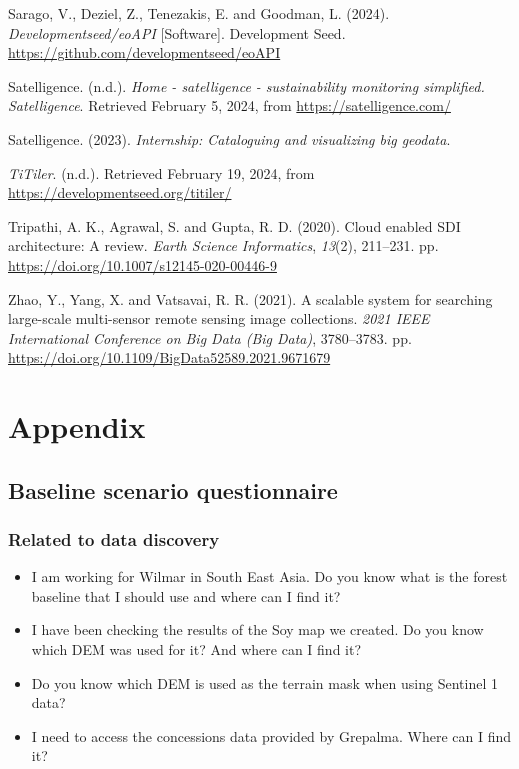 \documentclass[
  oneside,
  open=any]{scrbook}
\providecommand{\tightlist}{%
  \setlength{\itemsep}{0pt}\setlength{\parskip}{0pt}}\usepackage{longtable,booktabs,array}
\newlength{\cslhangindent}
\newenvironment{CSLReferences}[2] %
 {\begin{list}{}{%
  \setlength{\itemindent}{0pt}
  \setlength{\leftmargin}{0pt}
  \setlength{\parsep}{0pt}
  \ifodd #1
   \setlength{\leftmargin}{\cslhangindent}
   \setlength{\itemindent}{-1\cslhangindent}
  \fi
  \setlength{\itemsep}{#2\baselineskip}}}
 {\end{list}}
\begin{document}
\begin{CSLReferences}{1}{0}
Sarago, V., Deziel, Z., Tenezakis, E. and Goodman, L. (2024).
\emph{Developmentseed/{eoAPI}} {[}Software{]}. Development Seed.
\url{https://github.com/developmentseed/eoAPI}

Satelligence. (n.d.). \emph{Home - satelligence - sustainability
monitoring simplified. Satelligence}. Retrieved February 5, 2024, from
\url{https://satelligence.com/}

Satelligence. (2023). \emph{Internship: Cataloguing and visualizing big
geodata}.

\emph{{TiTiler}}. (n.d.). Retrieved February 19, 2024, from
\url{https://developmentseed.org/titiler/}

Tripathi, A. K., Agrawal, S. and Gupta, R. D. (2020). Cloud enabled
{SDI} architecture: A review. \emph{Earth Science Informatics},
\emph{13}(2), 211--231. pp.
\url{https://doi.org/10.1007/s12145-020-00446-9}

Zhao, Y., Yang, X. and Vatsavai, R. R. (2021). A scalable system for
searching large-scale multi-sensor remote sensing image collections.
\emph{2021 {IEEE} International Conference on Big Data (Big Data)},
3780--3783. pp. \url{https://doi.org/10.1109/BigData52589.2021.9671679}

\end{CSLReferences}

\chapter{Appendix}\label{appendix}

\section{Baseline scenario questionnaire}\label{sec-baseline-q}

\subsection*{Related to data discovery}\label{related-to-data-discovery}

\begin{itemize}
\tightlist
\item
  I am working for Wilmar in South East Asia. Do you know what is the
  forest baseline that I should use and where can I find it?
\item
  I have been checking the results of the Soy map we created. Do you
  know which DEM was used for it? And where can I find it?
\item
  Do you know which DEM is used as the terrain mask when using Sentinel
  1 data?
\item
  I need to access the concessions data provided by Grepalma. Where can
  I find it?
\end{itemize}
\end{document}
